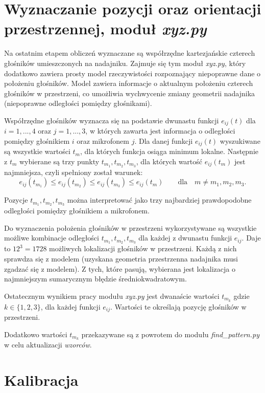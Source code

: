  
\section{Wyznaczanie pozycji oraz orientacji przestrzennej, moduł \textit{xyz.py}}

Na ostatnim etapem obliczeń wyznaczane są współrzędne kartezjańskie czterech głośników umieszczonych na nadajniku.
Zajmuje się tym moduł \textit{xyz.py}, który dodatkowo zawiera prosty model rzeczywistości
rozpoznający niepoprawne dane o położeniu głośników.
Model zawiera informacje o aktualnym położeniu czterech głośników w przestrzeni, co umożliwia wychwycenie 
zmiany geometrii nadajnika (niepoprawne odległości pomiędzy głośnikami).

Współrzędne głośników wyznacza się na podstawie dwunastu funkcji $e_{ij}(t)$ dla $i=1, ..., 4$ oraz $j=1, ..., 3$,
w których zawarta jest informacja o odległości pomiędzy głośnikiem $i$ oraz mikrofonem $j$.
Dla danej funkcji $e_{ij}(t)$ wyszukiwane są wszystkie wartości $t_m$, dla których funkcja osiąga minimum lokalne.
Następnie z $t_m$ wybierane są trzy punkty $t_{m_1}, t_{m_2}, t_{m_3}$, dla których wartość $e_{ij}(t_m)$ jest najmniejsza,
czyli spełniony został warunek:
\[ e_{ij}(t_{m_1}) \leq e_{ij}(t_{m_2}) \leq e_{ij}(t_{m_3}) \leq e_{ij}(t_m) \qquad \text{dla} \quad m \ne m_1,m_2,m_3. \]

Pozycje $t_{m_1}, t_{m_2}, t_{m_3}$  można interpretować jako trzy najbardziej prawdopodobne odległości 
pomiędzy głośnikiem a mikrofonem.

Do wyznaczenia położenia głośników w przestrzeni wykorzystywane są wszystkie możliwe kombinacje 
odległości $t_{m_1}, t_{m_2}, t_{m_3}$ dla każdej z dwunastu funkcji $e_{ij}$.
Daje to $12^3 = 1728$ możliwych lokalizacji głośników w przestrzeni. 
Każdą z nich sprawdza się z modelem (uzyskana geometria przestrzenna nadajnika musi zgadzać się z
modelem). Z tych, które pasują, wybierana jest lokalizacja o najmniejszym sumarycznym błędzie średniokwadratowym.

Ostatecznym wynikiem pracy modułu \textit{xyz.py} jest dwanaście wartości $t_{m_k}$ gdzie $k \in \{1,2,3\}$, 
dla każdej funkcji $e_{ij}$. Wartości te określają pozycję głośników w przestrzeni.

Dodatkowo wartości $t_{m_k}$ przekazywane są z powrotem do modułu \textit{find\_pattern.py} w celu aktualizacji \textit{wzorców}.


\section{Kalibracja}

